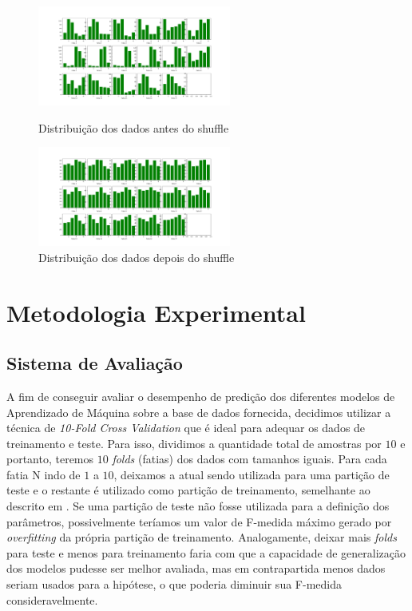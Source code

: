 \documentclass[10pt, conference, compsocconf]{IEEEtran}
\begin{document}
\begin{figure}[!t]
\centering
\includegraphics[width=2.5in]{imgs/antes_shuffle}
\caption{Distribuição dos dados antes do shuffle}
\label{fig:antes_shuffle}
\includegraphics[width=2.5in]{imgs/apos_shuffle}
\caption{Distribuição dos dados depois do shuffle}
\label{fig:apos_shuffle}
\end{figure}

\section{Metodologia Experimental}\label{sec:metodologia}
\subsection{Sistema de Avaliação}\label{subsec:sistema_avaliacao}
A fim de conseguir avaliar o desempenho de predição dos diferentes modelos 
de Aprendizado de Máquina sobre a base de dados fornecida, decidimos utilizar 
a técnica de \textit{10-Fold Cross Validation} que é ideal para adequar os 
dados de treinamento e teste. Para isso, dividimos a quantidade total de 
amostras por $10$ e portanto, teremos $10$ \textit{folds} (fatias) dos dados 
com tamanhos iguais. Para cada fatia N indo de $1$ a $10$, deixamos a atual 
sendo utilizada para uma partição de teste e o restante é utilizado como partição 
de treinamento, semelhante ao descrito em \cite{cross_validation}. Se uma partição de 
teste não fosse utilizada para a definição dos parâmetros, possivelmente 
teríamos um valor de F-medida máximo gerado por \textit{overfitting} da própria 
partição de treinamento. Analogamente, deixar mais \textit{folds} para teste e
menos para treinamento faria com que a capacidade de generalização dos modelos
pudesse ser melhor avaliada, mas em contrapartida menos dados seriam usados para
a hipótese, o que poderia diminuir sua F-medida consideravelmente.
\end{document}
